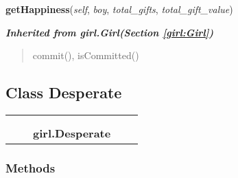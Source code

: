     \label{girl:Normal:getHappiness}

    \vspace{0.5ex}

\hspace{.8\funcindent}\begin{boxedminipage}{\funcwidth}

    \raggedright \textbf{getHappiness}(\textit{self}, \textit{boy}, \textit{total\_gifts}, \textit{total\_gift\_value})

\setlength{\parskip}{2ex}
\setlength{\parskip}{1ex}
    \end{boxedminipage}


\large{\textbf{\textit{Inherited from girl.Girl\textit{(Section \ref{girl:Girl})}}}}

\begin{quote}
commit(), isCommitted()
\end{quote}


\subsection{Class Desperate}

    \label{girl:Desperate}
\begin{tabular}{cccccc}
\multicolumn{2}{r}{\settowidth{\BCL}{girl.Girl}\multirow{2}{\BCL}{girl.Girl}}
&&
  \\\cline{3-3}
  &&\multicolumn{1}{c|}{}
&&
  \\
&&\multicolumn{2}{l}{\textbf{girl.Desperate}}
\end{tabular}



  \subsubsection{Methods}

